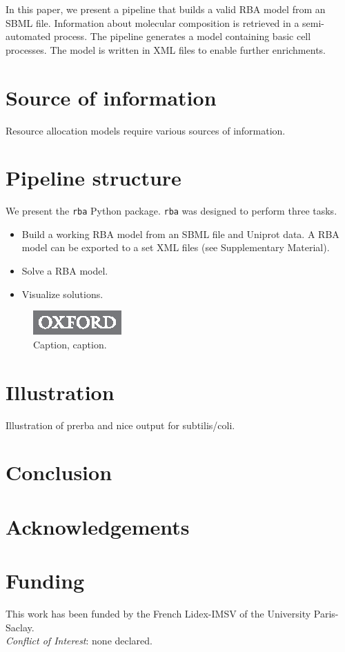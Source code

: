 \documentclass{bioinfo}
\begin{document}
In this paper, we present a pipeline that builds
a valid RBA model from an SBML file.
Information about molecular composition is retrieved in
a semi-automated process.
The pipeline generates a model containing basic cell processes.
The model is written in XML files to enable further enrichments.

\section{Source of information}
Resource allocation models require various sources of information.

\section{Pipeline structure}

We present the \texttt{rba} Python package.
\texttt{rba} was designed to perform three tasks.
\begin{itemize}
  \item Build a working RBA model from an SBML file and Uniprot data.
  A RBA model can be exported to a set XML files (see Supplementary Material).
  \item Solve a RBA model.
  \item Visualize solutions.
\end{itemize}


\begin{figure}[!tpb]%
\centerline{\includegraphics{OUP_First_SBk_Bot_8401.eps}}
\caption{Caption, caption.}\label{fig:01}
\end{figure}

\section{Illustration}

Illustration of prerba and nice output for subtilis/coli.

\section{Conclusion}

\section*{Acknowledgements}

\section*{Funding}

This work has been funded by the French Lidex-IMSV of the University Paris-Saclay.\\
\textit{Conflict of Interest}: none declared.
\vspace*{-12pt}


%
%
%
%
%
%
%

\end{document}
